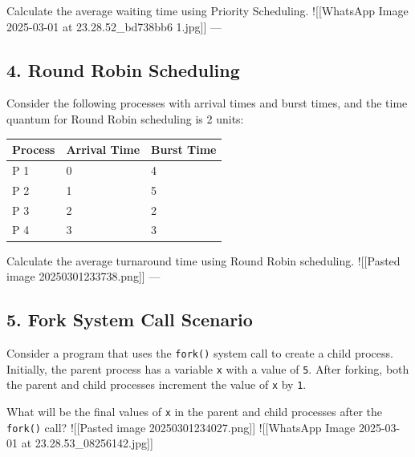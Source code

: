 Calculate the average waiting time using Priority Scheduling.
!{[}{[}WhatsApp Image 2025-03-01 at 23.28.52\_bd738bb6 1.jpg{]}{]} ---

\subsection{4. Round Robin Scheduling}\label{round-robin-scheduling}

Consider the following processes with arrival times and burst times, and
the time quantum for Round Robin scheduling is 2 units:

\begin{longtable}[]{@{}lll@{}}
\toprule\noalign{}
Process & Arrival Time & Burst Time \\
\midrule\noalign{}
\endhead
\bottomrule\noalign{}
\endlastfoot
P 1 & 0 & 4 \\
P 2 & 1 & 5 \\
P 3 & 2 & 2 \\
P 4 & 3 & 3 \\
\end{longtable}

Calculate the average turnaround time using Round Robin scheduling.
!{[}{[}Pasted image 20250301233738.png{]}{]} ---

\subsection{5. Fork System Call
Scenario}\label{fork-system-call-scenario}

Consider a program that uses the \texttt{fork()} system call to create a
child process. Initially, the parent process has a variable \texttt{x}
with a value of \texttt{5}. After forking, both the parent and child
processes increment the value of \texttt{x} by \texttt{1}.

What will be the final values of \texttt{x} in the parent and child
processes after the \texttt{fork()} call? !{[}{[}Pasted image
20250301234027.png{]}{]} !{[}{[}WhatsApp Image 2025-03-01 at
23.28.53\_08256142.jpg{]}{]}
